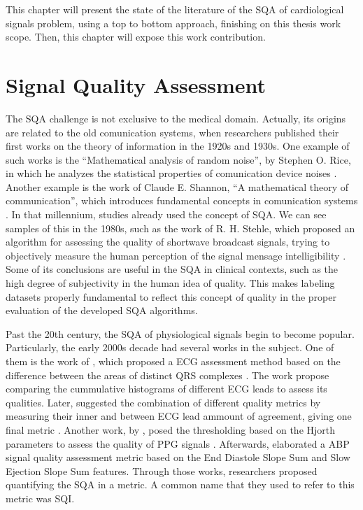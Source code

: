 

This chapter will present the state of the literature of the \acrlong{SQA} of cardiological signals problem, using a top to bottom approach, finishing on this thesis work scope. Then, this chapter will expose this work contribution.

\section{Signal Quality Assessment}

The \acrfull{SQA} challenge is not exclusive to the medical domain. Actually, its origins are related to the old comunication systems, when researchers published their first works on the theory of information in the 1920s and 1930s. One example of such works is the ``Mathematical analysis of random noise'', by Stephen O. Rice, in which he analyzes the statistical properties of comunication device noises \cite{origins-1}. Another example is the work of Claude E. Shannon, ``A mathematical theory of communication'', which introduces fundamental concepts in comunication systems \cite{origins-2}. In that millennium, studies already used the concept of \acrshort{SQA}. We can see samples of this in the 1980s, such as the work of R. H. Stehle, which proposed an algorithm for assessing the quality of shortwave broadcast signals, trying to objectively measure the human perception of the signal mensage intelligibility \cite{origins-3}. Some of its conclusions are useful in the \acrshort{SQA} in clinical contexts, such as the high degree of subjectivity in the human idea of quality. This makes labeling datasets properly fundamental to reflect this concept of quality in the proper evaluation of the developed \acrshort{SQA} algorithms.
	
Past the 20th century, the \acrshort{SQA} of physiological signals begin to become popular. Particularly, the early 2000s decade had several works in the subject. One of them is the work of \citeauthor{2000s-1}, which proposed a \acrshort{ECG} assessment method based on the difference between the areas of distinct QRS complexes \cite{2000s-1}. The work propose comparing the cummulative histograms of different \acrshort{ECG} leads to assess its qualities. Later, \citeauthor{2000s-2} suggested the combination of different quality metrics by measuring their inner and between \acrshort{ECG} lead ammount of agreement, giving one final metric \cite{2000s-2}. Another work, by \citeauthor{2000s-3}, posed the thresholding based on the Hjorth parameters to assess the quality of \acrshort{PPG} signals \cite{2000s-3}. Afterwards, \citeauthor{2000s-4} elaborated a \acrshort{ABP} signal quality assessment metric based on the End Diastole Slope Sum and Slow Ejection Slope Sum features. Through those works, researchers proposed quantifying the \acrshort{SQA} in a metric. A common name that they used to refer to this metric was \acrfull{SQI}. 


